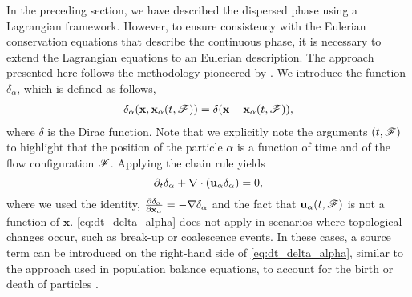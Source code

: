 In the preceding section, we have described the dispersed phase using a Lagrangian framework. 
However, to ensure consistency with the Eulerian conservation equations that describe the continuous phase, it is necessary to extend the Lagrangian equations to an Eulerian description. 
The approach presented here follows the methodology pioneered by \citep{lhuillier1992ensemble}.
We introduce the function $\delta_\alpha$, which is defined as follows, 
\begin{align}
    \delta_\alpha(\textbf{x},\textbf{x}_\alpha(t,\mathscr{F})) 
    = \delta(\textbf{x}-\textbf{x}_\alpha(t,\mathscr{F})),
    \label{eq:delta_alpha}
\end{align}
where $\delta$ is the Dirac function.
Note that we explicitly note the arguments $(t,\mathscr{F})$ to highlight that the position of the particle $\alpha$ is a function of time and of the flow configuration $\mathscr{F}$.
Applying the chain rule yields \citep{lhuillier1998}%
\begin{equation}
    \partial_t \delta_\alpha
    + \mathbf{\nabla}\cdot (\textbf{u}_\alpha  \delta_\alpha)
    =0,
    \label{eq:dt_delta_alpha}
\end{equation}
where we used the identity, $\frac{\partial \delta_\alpha}{\partial \textbf{x}_\alpha}  = -\mathbf{\nabla} \delta_\alpha$ and the fact that $\textbf{u}_\alpha(t,\mathscr{F})$ is not a function of $\textbf{x}$. 
\ref{eq:dt_delta_alpha} does not apply in scenarios where topological changes occur, such as break-up or coalescence events. 
In these cases, a source term can be introduced on the right-hand side of \ref{eq:dt_delta_alpha}, similar to the approach used in population balance equations, to account for the birth or death of particles \citep{randolph2012theory}.
